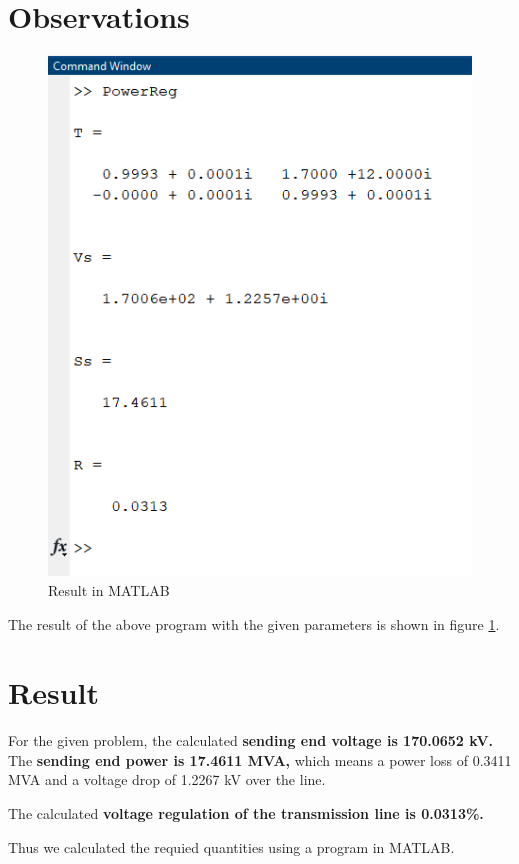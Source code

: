 \documentclass[a4paper,12pt]{article}
\begin{document}
  \section{Observations}
  \begin{figure}[H]
    \centering
    \includegraphics{img/run.png}
    \caption{Result in MATLAB}
    \label{result}
  \end{figure}
  The result of the above program with the given parameters 
  is shown in figure \ref{result}.

  \section{Result}
  For the given problem, the calculated {\bf sending end voltage is 170.0652 kV.}
  The {\bf sending end power is 17.4611 MVA,} which means a power loss of 0.3411 MVA 
  and a voltage drop of 1.2267 kV over the line.

  The calculated {\bf voltage regulation of the transmission line is 0.0313\%.}

  Thus we calculated the requied quantities using a program in MATLAB.
\end{document}
